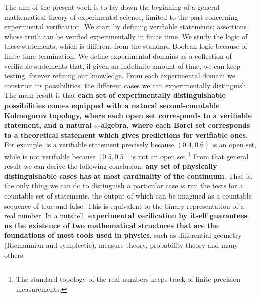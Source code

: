 \documentclass[letterpaper]{article}
\begin{document}
The aim of the present work is to lay down the beginning of a general mathematical theory of experimental science, limited to the part concerning experimental verification. We start by defining verifiable statements: assertions whose truth can be verified experimentally in finite time. We study the logic of these statements, which is different from the standard Boolean logic because of finite time termination. We define experimental domains as a collection of verifiable statements that, if given an indefinite amount of time, we can keep testing, forever refining our knowledge. From each experimental domain we construct its possibilities: the different cases we can experimentally distinguish. The main result is that \textbf{each set of experimentally distinguishable possibilities comes equipped with a natural second-countable Kolmogorov topology, where each open set corresponds to a verifiable statement, and a natural $\sigma$-algebra, where each Borel set corresponds to a theoretical statement which gives predictions for verifiable ones.} For example,  is a verifiable statement precisely because $(0.4, 0.6)$ is an open set, while  is not verifiable because $[0.5,0.5]$ is not an open set.\footnote{The standard topology of the real numbers keeps track of finite precision measurements.} From that general result we can derive the following conclusion: \textbf{any set of physically distinguishable cases has at most cardinality of the continuum}. That is, the only thing we can do to distinguish a particular case is run the tests for a countable set of statements, the output of which can be imagined as a countable sequence of true and false. This is equivalent to the binary representation of a real number. In a nutshell, \textbf{experimental verification by itself guarantees us the existence of two mathematical structures that are the foundations of most tools used in physics}, such as differential geometry (Riemannian and symplectic), measure theory, probability theory and many others.

\end{document}
